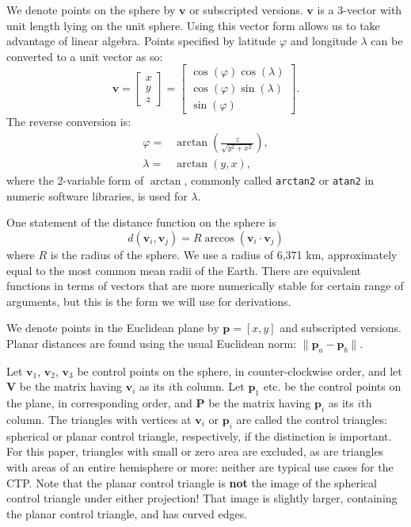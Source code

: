 \documentclass[]{interact}
\begin{document}
We denote points on the sphere by $\mathbf v$ or subscripted versions.
$\mathbf v$ is a 3-vector with unit length lying on the unit sphere.
Using this vector form allows us to take advantage of linear algebra.
Points specified by latitude $\varphi$ and longitude $\lambda$
can be converted to a unit vector as so: \citep{kent}
\begin{equation}
\mathbf v =
\begin{bmatrix*}
  x \\ y \\ z
\end{bmatrix*}
=
\begin{bmatrix*}
 \cos(\varphi) \cos(\lambda) \\
 \cos(\varphi) \sin(\lambda) \\
 \sin(\varphi)
\end{bmatrix*}.
\end{equation}
The reverse conversion is:
\begin{equation}\begin{split}
  \varphi =& \arctan\left(\frac{z}{\sqrt{y^2 + x^2}}\right), \\
  \lambda =& \arctan\left(y, x\right),
\end{split}\end{equation}
where the 2-variable form of $\arctan$, commonly called \texttt{arctan2} or
\texttt{atan2} in numeric software libraries, is used for $\lambda$.

One statement of the distance function on the sphere is
\begin{equation}
d\left(\mathbf v_i, \mathbf v_j\right)
= R \arccos\left(\mathbf v_i \cdot \mathbf v_j\right)
\end{equation}
where $R$ is the radius of the sphere. We use a radius of 6,371 km,
approximately equal to the most common mean radii of the Earth. \citep{snyder87}
There are equivalent functions in terms of vectors
that are more numerically stable for certain range of arguments,
but this is the form we will use for derivations.

We denote points in the Euclidean plane by $\mathbf p = [x, y]$ and
subscripted versions. Planar distances are found using the usual
Euclidean norm: $\|\mathbf p_a - \mathbf p_b\|$.

Let $\mathbf v_1$, $\mathbf v_2$, $\mathbf v_3$ be control points on the
sphere, in counter-clockwise order, and let $\mathbf V$ be the matrix having
$\mathbf v_i$ as its $i$th column. Let $\mathbf p_1$ etc. be the control points
on the plane, in corresponding order, and $\mathbf P$ be the matrix having
$\mathbf p_i$ as its $i$th column. The triangles with vertices at $\mathbf v_i$
or $\mathbf p_i$ are called the control triangles: spherical or planar control
triangle, respectively, if the distinction is important. For this paper,
triangles with small or zero area are excluded, as are triangles with areas of
an entire hemisphere or more: neither are typical use cases for the CTP.
Note that the planar control triangle is \textbf{not} the image of the
spherical control triangle under either projection! That image is
slightly larger, containing the planar control triangle, and has curved edges.
\end{document}
